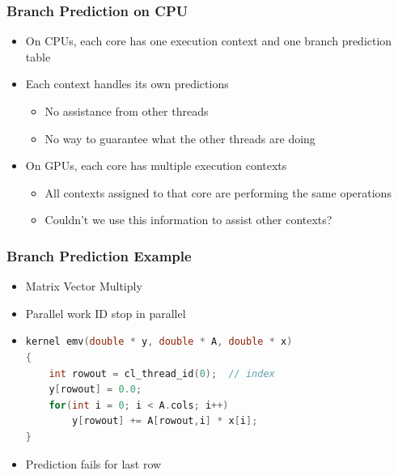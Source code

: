 \documentclass{beamer}
\begin{document}
\begin{frame}
	\frametitle{Branch Prediction on CPU}
	\begin{itemize}
		\item On CPUs, each core has one execution context and one branch prediction table
		\item Each context handles its own predictions
		\begin{itemize}
			\item No assistance from other threads 
			\item No way to guarantee what the other threads are doing
		\end{itemize}
		\item On GPUs, each core has multiple execution contexts
		\begin{itemize}
			\item All contexts assigned to that core are performing the same operations
			\item Couldn't we use this information to assist other contexts?
		\end{itemize}
	\end{itemize}
\end{frame}

\begin{frame}[fragile]
	\frametitle{Branch Prediction Example}
	\begin{itemize}
		\item Matrix Vector Multiply
		\item Parallel work ID stop in parallel
		\item
	\begin{lstlisting}[language=C]
kernel emv(double * y, double * A, double * x)
{
	int rowout = cl_thread_id(0);  // index
	y[rowout] = 0.0;
	for(int i = 0; i < A.cols; i++)
		y[rowout] += A[rowout,i] * x[i];
}
	\end{lstlisting}
		\item Prediction fails for last row
	\end{itemize}
\end{frame}
\end{document}

